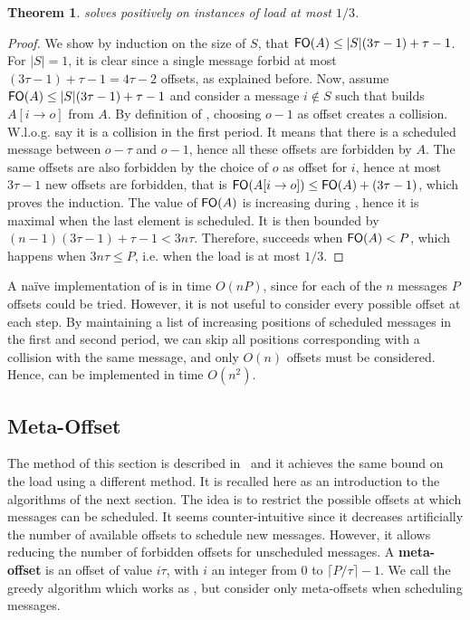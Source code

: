 \documentclass[pdflatex,sn-mathphys,iicol]{sn-jnl}%
\theoremstyle{thmstyleone}%
\newtheorem{theorem}{Theorem}%
\theoremstyle{thmstyletwo}%
\theoremstyle{thmstylethree}%
\begin{document}
\begin{theorem}
\firstfit solves \pma positively on instances of load at most $1/3$. 
\end{theorem}
\begin{proof}
We show by induction on the size of $S$, that $\textsf{FO}(A) \leq \lvert S\rvert(3\tau -1) + \tau - 1$. For $\lvert S\rvert = 1$, it is clear since a single message forbid at most $(3\tau -1) + \tau -1 = 4\tau-2$ offsets, as explained before. Now, assume $\textsf{FO}(A) \leq \lvert S\rvert(3\tau -1) + \tau -1$ and consider a message $i \notin S$ such that \firstfit builds $A[i \rightarrow o]$ from $A$. By definition of \firstfit, choosing $o-1$ as offset creates a collision. W.l.o.g. say it is a collision in the first period. It means that there is a scheduled message between $o - \tau $ and $o-1$, hence all these offsets are forbidden by $A$. The same offsets are also forbidden by the choice of $o$ as offset for $i$, hence at most $3\tau -1$ new offsets are forbidden, that is $\textsf{FO}(A[i \rightarrow o]) \leq \textsf{FO}(A) + (3\tau -1)$, which proves the induction. 
The value of $\textsf{FO}(A)$ is increasing during \firstfit, hence it is maximal when the last element is scheduled. It is then bounded by $(n-1)(3\tau -1) + \tau - 1 < 3n\tau$.
Therefore, \firstfit succeeds when $\textsf{FO}(A) < P$, which happens when $3n\tau \leq P$, i.e. when the load is at most $1/3$.
\end{proof}


A naïve implementation of \firstfit is in time $O(nP)$, since for each of the $n$ messages $P$ offsets could be tried. However, it is not useful to consider every possible offset at each step. By maintaining a list of increasing positions of scheduled messages in the first and second period, 
we can skip all positions corresponding with a collision with the same message, and only $O(n)$ offsets must be considered. Hence, \firstfit can be implemented in time $O(n^2)$.

\subsection{Meta-Offset}

The method of this section is described in~\cite{bartharxiv2018deterministic} and it achieves the same bound on the load using a different method. It is recalled here as an introduction to the algorithms of the next section.
The idea is to restrict the possible offsets at which messages can be scheduled. It seems counter-intuitive since it decreases artificially the number of available offsets to schedule new messages. However, it allows reducing the number of forbidden offsets for unscheduled messages. A \textbf{meta-offset} is an offset of value $i\tau$,
with $i$ an integer from $0$ to $\lceil P / \tau \rceil - 1$. We call \metaoffset the greedy algorithm which works as \firstfit, but consider only meta-offsets when scheduling messages. 
\end{document}
